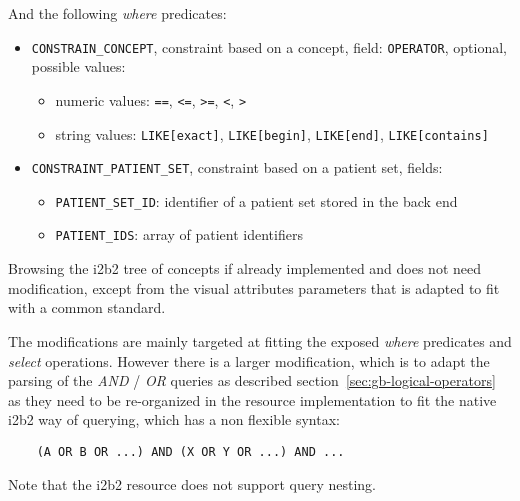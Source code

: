 And the following \emph{where} predicates:
\begin{itemize}
    \item \verb|CONSTRAIN_CONCEPT|, constraint based on a concept, field:
    \verb|OPERATOR|, optional, possible values:
    \begin{itemize}
        \item numeric values: \verb|==|, \verb|<=|, \verb|>=|, \verb|<|, \verb|>|
        \item string values: \verb|LIKE[exact]|, \verb|LIKE[begin]|, \verb|LIKE[end]|, \verb|LIKE[contains]|
    \end{itemize}
    
    \item \verb|CONSTRAINT_PATIENT_SET|, constraint based on a patient set, fields:
    \begin{itemize}
        \item \verb|PATIENT_SET_ID|: identifier of a patient set stored in the back end
        \item \verb|PATIENT_IDS|: array of patient identifiers
    \end{itemize}
\end{itemize}

Browsing the i2b2 tree of concepts if already implemented and does not need modification, except from the visual attributes parameters that is adapted to fit with a common standard.

The modifications are mainly targeted at fitting the exposed \emph{where} predicates and \emph{select} operations.
However there is a larger modification, which is to adapt the parsing of the \emph{AND} / \emph{OR} queries as described section~\ref{sec:gb-logical-operators} as they need to be re-organized in the resource implementation to fit the native i2b2 way of querying, which has a non flexible syntax:
\begin{verbatim}
    (A OR B OR ...) AND (X OR Y OR ...) AND ...
\end{verbatim}
Note that the i2b2 resource does not support query nesting.



